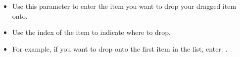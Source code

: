 
\begin{itemize}
\item Use this parameter to enter the item you want to drop your dragged item onto.
\item Use the index of the item to indicate where to drop.
\item For example, if you want to drop onto the first item in the list, enter: .
\end{itemize}

      
